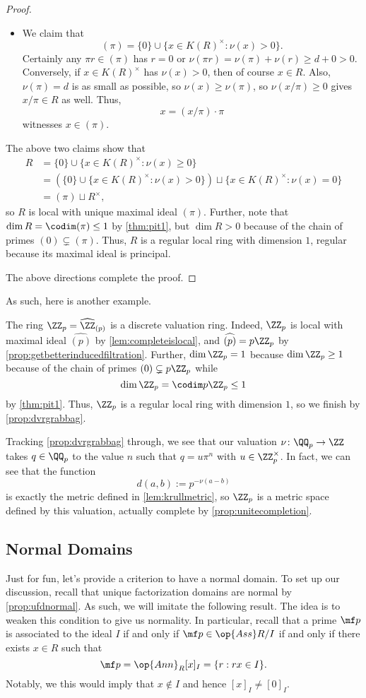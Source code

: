 \documentclass[../notes.tex]{subfiles}
\begin{document}
\begin{proof}
\begin{itemize}
\begin{itemize}
			\item We claim that
			\[(\pi)=\{0\}\cup\{x\in K(R)^\times:\nu(x)>0\}.\]
			Certainly any $\pi r\in(\pi)$ has $r=0$ or $\nu(\pi r)=\nu(\pi)+\nu(r)\ge d+0>0$. Conversely, if $x\in K(R)^\times$ has $\nu(x)>0$, then of course $x\in R$. Also, $\nu(\pi)=d$ is as small as possible, so $\nu(x)\ge\nu(\pi)$, so $\nu(x/\pi)\ge0$ gives $x/\pi\in R$ as well. Thus,
			\[x=(x/\pi)\cdot\pi\]
			witnesses $x\in(\pi)$.
		\end{itemize}
		The above two claims show that
		\begin{align*}
			R &= \{0\}\cup\{x\in K(R)^\times:\nu(x)\ge0\} \\
			&= \left(\{0\}\cup\{x\in K(R)^\times:\nu(x)>0\}\right)\sqcup\{x\in K(R)^\times:\nu(x)=0\} \\
			&=(\pi)\sqcup R^\times,
		\end{align*}
		so $R$ is local with unique maximal ideal $(\pi)$. Further, note that $\dim R=\codim(\pi)\le1$ by \autoref{thm:pit1}, but $\dim R>0$ because of the chain of primes $(0)\subsetneq(\pi)$. Thus, $R$ is a regular local ring with dimension $1$, regular because its maximal ideal is principal.
	\end{itemize}
	The above directions complete the proof.
\end{proof}
As such, here is another example.
\begin{example}
	The ring $\ZZ_p=\widehat{\ZZ}_{(p)}$ is a discrete valuation ring. Indeed, $\ZZ_p$ is local with maximal ideal $\widehat{(p)}$ by \autoref{lem:completeislocal}, and $\widehat{(p)}=p\ZZ_p$ by \autoref{prop:getbetterinducedfiltration}. Further, $\dim\ZZ_p=1$ because $\dim\ZZ_p\ge1$ because of the chain of primes $(0)\subsetneq p\ZZ_p$ while
	\[\dim\ZZ_p=\codim p\ZZ_p\le1\]
	by \autoref{thm:pit1}. Thus, $\ZZ_p$ is a regular local ring with dimension $1$, so we finish by \autoref{prop:dvrgrabbag}.
\end{example}
\begin{remark}
	Tracking \autoref{prop:dvrgrabbag} through, we see that our valuation $\nu\colon\QQ_p\to\ZZ$ takes $q\in\QQ_p$ to the value $n$ such that $q=u\pi^n$ with $u\in\ZZ_p^\times$. In fact, we can see that the function
	\[d(a,b):=p^{-\nu(a-b)}\]
	is exactly the metric defined in \autoref{lem:krullmetric}, so $\ZZ_p$ is a metric space defined by this valuation, actually complete by \autoref{prop:unitecompletion}.
\end{remark}

\subsection{Normal Domains}
Just for fun, let's provide a criterion to have a normal domain. To set up our discussion, recall that unique factorization domains are normal by \autoref{prop:ufdnormal}. As such, we will imitate the following result.
\equivufdprop*
\noindent The idea is to weaken this condition to give us normality. In particular, recall that a prime $\mf p$ is associated to the ideal $I$ if and only if $\mf p\in\op{Ass}R/I$ if and only if there exists $x\in R$ such that
\[\mf p=\op{Ann}_R[x]_I=\{r:rx\in I\}.\]
Notably, we this would imply that $x\notin I$ and hence $[x]_I\ne[0]_I$.
\end{document}
